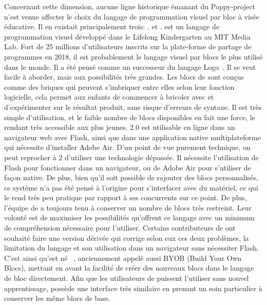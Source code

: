                 Concernant cette dimension, aucune ligne historique émanant du Poppy-project n'est venue affecter le choix du langage de programmation visuel par bloc à visée éducative.
                Il en existait principalement trois: ,  et .
                 est un langage de programmation visuel développé dans le Lifelong Kindergarten au MIT Media Lab.
                Fort de 25 millions d'utilisateurs inscrits sur la plate-forme de partage de programmes en 2018, il est probablement le langage visuel par blocs le plus utilisé dans le monde. 
                Il a été pensé comme un successeur du langage Logo~. Il se veut facile à aborder, mais aux possibilités très grandes.    
                Les blocs de  sont conçus comme des briques qui peuvent s'imbriquer entre elles selon leur fonction logicielle, cela permet aux enfants de commencer à bricoler avec et d'expérimenter sur le résultat produit, sans risque d'erreurs de syntaxe.
                Il est très simple d'utilisation, et le faible nombre de blocs disponibles en fait une force, le rendant très accessible aux plus jeunes.
                 2.0 est utilisable en ligne dans un navigateur web avec Flash, ainsi que dans une application native multiplateforme qui nécessite d'installer Adobe Air.
                D'un point de vue purement technique, on peut reprocher à  2 d'utiliser une technologie dépassée. Il nécessite l'utilisation de Flash pour fonctionner dans un navigateur, ou de Adobe Air pour s'utiliser de façon native. De plus, bien qu'il soit possible de rajouter des blocs personnalisés, ce système n'a pas été pensé à l'origine pour s'interfacer avec du matériel, ce qui le rend très peu pratique par rapport à ses concurrents sur ce point.
                De plus, l'équipe de  a toujours tenu à conserver un nombre de blocs très restreint. Leur volonté est de maximiser les possibilités qu'offrent ce langage avec un minimum de compréhension nécessaire pour l'utiliser.
                Certains contributeurs de  ont souhaité faire une version dérivée qui corrige selon eux ces deux problèmes, la limitation du langage et son utilisation dans un navigateur sans nécessiter Flash. C'est ainsi qu'est né ~, anciennement appelé aussi BYOB (Build Your Own Blocs), mettant en avant la facilité de créer des nouveaux blocs dans le langage de bloc directement.
                Afin que les utilisateurs de  puissent l'utiliser sans nouvel apprentissage,  possède une interface très similaire en prenant un soin particulier à conserver les même blocs de base.
